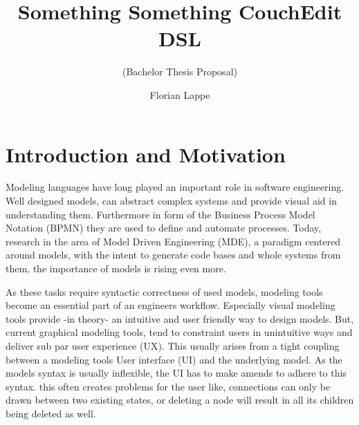 \documentclass[10pt,a4paper,oneside]{scrartcl}
\title{Something Something CouchEdit DSL}
\subtitle{(Bachelor Thesis Proposal)}
\author{Florian Lappe}
\newcommand\hint[2]{
\ifthenelse{\boolean{showhints}}{
\begin{center}
\colorbox{black!10}{
\begin{minipage}{.963\textwidth}
#2\hfill\textbf{#1}
\end{minipage}
}\end{center}}{}
}
\begin{document}
\maketitle

\section{Introduction and Motivation}
\label{sec:motivation}


Modeling languages have long played an important role in software engineering. Well designed models, can abstract complex systems and provide visual aid in understanding them. Furthermore in form of the Business Process Model Notation (BPMN) they are used to define and automate processes. Today, research in the area of Model Driven Engineering (MDE), a paradigm centered around models, with the intent to generate code bases and whole systems from them, the importance of models is rising even more.

As these tasks require syntactic correctness of used models, modeling tools become an essential part of an engineers workflow. Especially visual modeling tools provide -in theory- an intuitive and user friendly way to design models. But, current graphical modeling tools, tend to constraint users in unintuitive ways and deliver sub par user experience (UX). This usually arises from a tight coupling between a modeling tools User interface (UI) and the underlying model. As the models syntax is usually inflexible, the UI has to make amends to adhere to this syntax. this often creates problems for the user like, connections can only be drawn between two existing states, or deleting a node will result in all its children being deleted as well.
\end{document}
